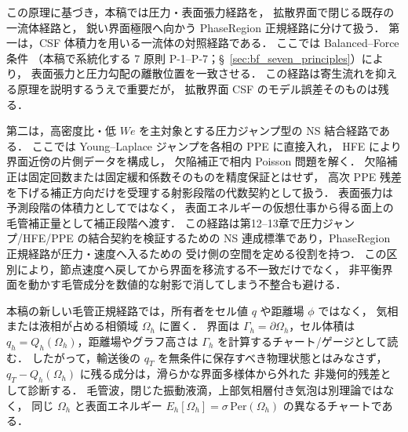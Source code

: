 この原理に基づき，本稿では圧力・表面張力経路を，
拡散界面で閉じる既存の一流体経路と，
鋭い界面極限へ向かう PhaseRegion 正規経路に分けて扱う．
第一は，CSF 体積力を用いる一流体の対照経路である．
ここでは Balanced--Force 条件
（本稿で系統化する 7 原則 P-1--P-7；§~\ref{sec:bf_seven_principles}）により，
表面張力と圧力勾配の離散位置を一致させる．
この経路は寄生流れを抑える原理を説明するうえで重要だが，
拡散界面 CSF のモデル誤差そのものは残る．

第二は，高密度比・低 $We$ を主対象とする圧力ジャンプ型の NS 結合経路である．
ここでは Young--Laplace ジャンプを各相の PPE に直接入れ，
HFE により界面近傍の片側データを構成し，
欠陥補正で相内 Poisson 問題を解く．
欠陥補正は固定回数または固定緩和係数そのものを精度保証とはせず，
高次 PPE 残差を下げる補正方向だけを受理する射影段階の代数契約として扱う．
表面張力は予測段階の体積力としてではなく，
表面エネルギーの仮想仕事から得る面上の毛管補正量として補正段階へ渡す．
この経路は第12--13章で圧力ジャンプ/HFE/PPE の結合契約を検証するための
NS 連成標準であり，PhaseRegion 正規経路が圧力・速度へ入るための
受け側の空間を定める役割を持つ．
この区別により，節点速度へ戻してから界面を移流する不一致だけでなく，
非平衡界面を動かす毛管成分を数値的な射影で消してしまう不整合も避ける．

本稿の新しい毛管正規経路では，所有者をセル値 $q$ や距離場 $\phi$ ではなく，
気相または液相が占める相領域 $\Omega_h$ に置く．
界面は $\Gamma_h=\partial\Omega_h$，セル体積は
$q_h=Q_h(\Omega_h)$，距離場やグラフ高さは
$\Gamma_h$ を計算するチャート/ゲージとして読む．
したがって，輸送後の $q_T$ を無条件に保存すべき物理状態とはみなさず，
$q_T-Q_h(\Omega_h)$ に残る成分は，滑らかな界面多様体から外れた
非幾何的残差として診断する．
毛管波，閉じた振動液滴，上部気相層付き気泡は別理論ではなく，
同じ $\Omega_h$ と表面エネルギー
$E_h[\Omega_h]=\sigma\,\mathrm{Per}(\Omega_h)$ の異なるチャートである．

